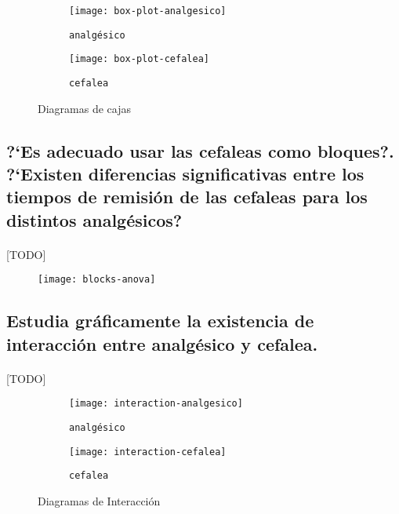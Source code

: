 \documentclass[11pt]{article}
\begin{document}
      \begin{figure}[H]
        \centering
        \begin{subfigure}{.5\textwidth}
          \centering
          \texttt{[image: box-plot-analgesico]}
          \caption{\texttt{analgésico}}
          \label{fig:sub1}
        \end{subfigure}%
        \begin{subfigure}{.5\textwidth}
          \centering
          \texttt{[image: box-plot-cefalea]}
          \caption{\texttt{cefalea}}
          \label{fig:sub2}
        \end{subfigure}
        \caption{Diagramas de cajas}
        \label{fig:test}
      \end{figure}


    \subsection{?`Es adecuado usar las cefaleas como bloques?. ?`Existen diferencias significativas entre los tiempos de remisión de las cefaleas para los distintos analgésicos?}

      \paragraph{}
      [TODO]

      \begin{figure}[H]
        \centering
        \texttt{[image: blocks-anova]}
        \caption{}
        \label{}
      \end{figure}

    \subsection{Estudia gráficamente la existencia de interacción entre analgésico y cefalea.}

      \paragraph{}
      [TODO]

      \begin{figure}[H]
        \centering
        \begin{subfigure}{.5\textwidth}
          \centering
          \texttt{[image: interaction-analgesico]}
          \caption{\texttt{analgésico}}
          \label{fig:sub1}
        \end{subfigure}%
        \begin{subfigure}{.5\textwidth}
          \centering
          \texttt{[image: interaction-cefalea]}
          \caption{\texttt{cefalea}}
          \label{fig:sub2}
        \end{subfigure}
        \caption{Diagramas de Interacción}
        \label{fig:test}
      \end{figure}
\end{document}
